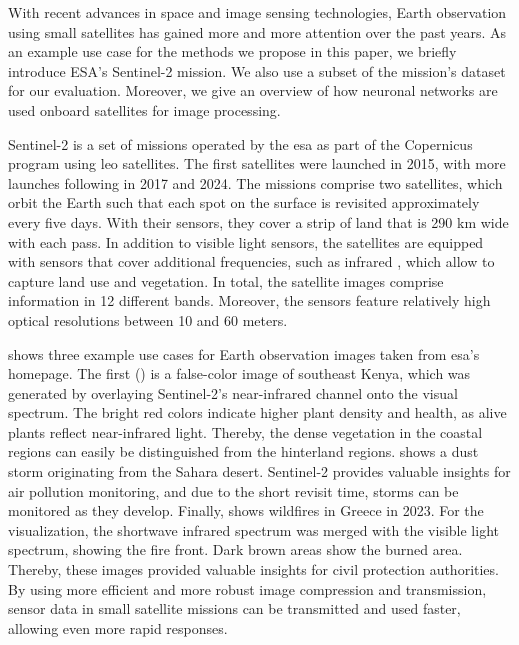 \documentclass[conference]{IEEEtran}
\newcommand\sentinelii{Sentinel-2\xspace}
\begin{document}

With recent advances in space and image sensing technologies, Earth observation using small satellites has gained more and more attention over the past years.
As an example use case for the methods we propose in this paper, we briefly introduce ESA's \sentinelii mission.
We also use a subset of the mission's dataset for our evaluation.
Moreover, we give an overview of how neuronal networks are used onboard satellites for image processing.

\sentinelii \cite{sentinel2} is a set of missions operated by the \ac{esa} as part of the Copernicus program using \ac{leo} satellites.
The first satellites were launched in 2015, with more launches following in 2017 and 2024.
The missions comprise two satellites, which orbit the Earth such that each spot on the surface is revisited approximately every five days.
With their sensors, they cover a strip of land that is 290 km wide with each pass.
In addition to visible light sensors, the satellites are equipped with sensors that cover additional frequencies, such as infrared \cite{sentinel-2-user-handbook}, which allow to capture land use and vegetation.
In total, the satellite images comprise information in 12 different bands. %
Moreover, the sensors feature relatively high optical resolutions between 10 and 60 meters.


 shows three example use cases for Earth observation images taken from \ac{esa}'s homepage.
The first () is a false-color image of southeast Kenya, which was generated by overlaying \sentinelii's near-infrared channel onto the visual spectrum.
The bright red colors indicate higher plant density and health, as alive plants reflect near-infrared light.
Thereby, the dense vegetation in the coastal regions can easily be distinguished from the hinterland regions.
 shows a dust storm originating from the Sahara desert.
\sentinelii provides valuable insights for air pollution monitoring, and due to the short revisit time, storms can be monitored as they develop.
Finally,  shows wildfires in Greece in 2023.
For the visualization, the shortwave infrared spectrum was merged with the visible light spectrum, showing the fire front.
Dark brown areas show the burned area.
Thereby, these images provided valuable insights for civil protection authorities.
By using more efficient and more robust image compression and transmission, sensor data in small satellite missions can be transmitted and used faster, allowing even more rapid responses.
\end{document}
